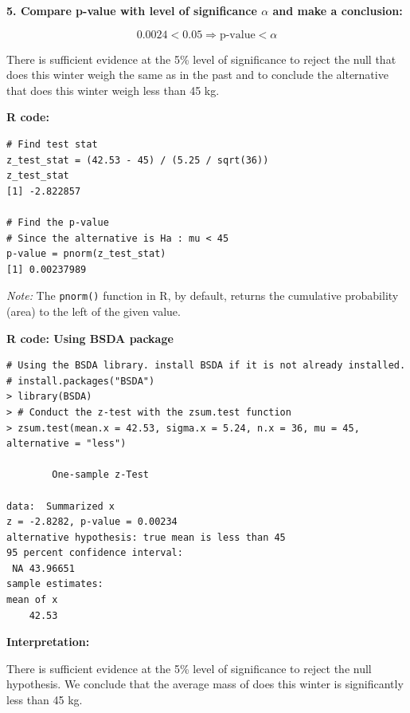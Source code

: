 \begin{example}
\textbf{5. Compare p-value with level of significance \(\alpha\) and make a conclusion:}

\[
0.0024 < 0.05 \Rightarrow \text{p-value} < \alpha
\]

There is sufficient evidence at the 5\% level of significance to reject the null that does this winter weigh the same as in the past and to conclude the alternative that does this winter weigh less than 45 kg.

\vspace{1em} %
\noindent\textbf{R code:}
\vspace{0.8em}
\begin{tcolorbox}[
  colback=gray!10, 
  colframe=black!45, 
  arc=2mm, 
  breakable, 
  after skip=0pt,  %
  before skip=0.3pt, %
  boxsep=1pt, left=4pt, right=4pt, top=2pt, bottom=2pt %
]
\begin{verbatim}
# Find test stat
z_test_stat = (42.53 - 45) / (5.25 / sqrt(36))
z_test_stat
[1] -2.822857

# Find the p-value
# Since the alternative is Ha : mu < 45
p-value = pnorm(z_test_stat)
[1] 0.00237989
\end{verbatim}
\end{tcolorbox}
\noindent\textit{Note:} The \texttt{pnorm()} function in R, by default, returns the cumulative probability (area) to the left of the given value. \\
\par\vspace{0.8em}  %
\noindent\textbf{R code: Using BSDA package}
\vspace{0.3em}

\begin{tcolorbox}[colback=gray!10, colframe=black!45, arc=2mm,
  breakable, boxsep=1pt, left=4pt, right=4pt, top=2pt, bottom=2pt,
  before skip=0pt, after skip=1em]
\small
\begin{verbatim}
# Using the BSDA library. install BSDA if it is not already installed.
# install.packages("BSDA")
> library(BSDA)
> # Conduct the z-test with the zsum.test function
> zsum.test(mean.x = 42.53, sigma.x = 5.24, n.x = 36, mu = 45, alternative = "less")

        One-sample z-Test

data:  Summarized x
z = -2.8282, p-value = 0.00234
alternative hypothesis: true mean is less than 45
95 percent confidence interval:
 NA 43.96651
sample estimates:
mean of x 
    42.53 
\end{verbatim}
\end{tcolorbox}

\vspace{1em}
\noindent\textbf{Interpretation:}

There is sufficient evidence at the 5\% level of significance to reject the null hypothesis. We conclude that the average mass of does this winter is significantly less than 45 kg.
\end{example}








